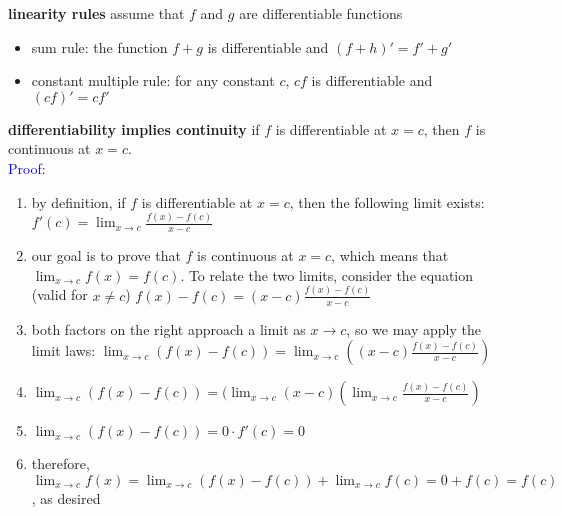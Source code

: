 \documentclass{article}
\begin{document}
\textbf{linearity rules} assume that $f$ and $g$ are differentiable functions
	\begin{itemize}
		\item sum rule: the function $f + g$ is differentiable and $(f + h)' = f' + g'$
		\item constant multiple rule: for any constant $c$, $cf$ is differentiable and $(cf)' = cf'$
	\end{itemize}

\textbf{differentiability implies continuity} if $f$ is differentiable at $x = c$, then $f$ is continuous at $x = c$.\\
\textcolor{blue}{Proof:}
	\begin{enumerate}
		\item by definition, if $f$ is differentiable at $x = c$, then the following limit exists: $f'(c) = \lim_{x \to c}\frac{f(x) - f(c)}{x - c}$
		\item our goal is to prove that $f$ is continuous at $x = c$, which means that $\lim_{x \to c}f(x) = f(c)$. To relate the two limits, consider the equation (valid for $x \neq c$) $f(x) - f(c) = (x - c)\frac{f(x) - f(c)}{x - c}$
		\item both factors on the right approach a limit as $x \to c$, so we may apply the limit laws: $\lim_{x \to c}(f(x) - f(c)) = \lim_{x \to c}((x - c)\frac{f(x) - f(c)}{x - c})$
		\item $\lim_{x \to c}(f(x) - f(c)) = (\lim_{x \to c}(x - c)(\lim_{x \to c}\frac{f(x) - f(c)}{x - c})$
		\item $\lim_{x \to c}(f(x) - f(c)) = 0 \cdot f'(c) = 0$
		\item therefore, $\lim_{x \to c}f(x) = \lim_{x \to c}(f(x) - f(c)) + \lim_{x \to c}f(c) = 0 + f(c) = f(c)$, as desired
	\end{enumerate}
\end{document}
